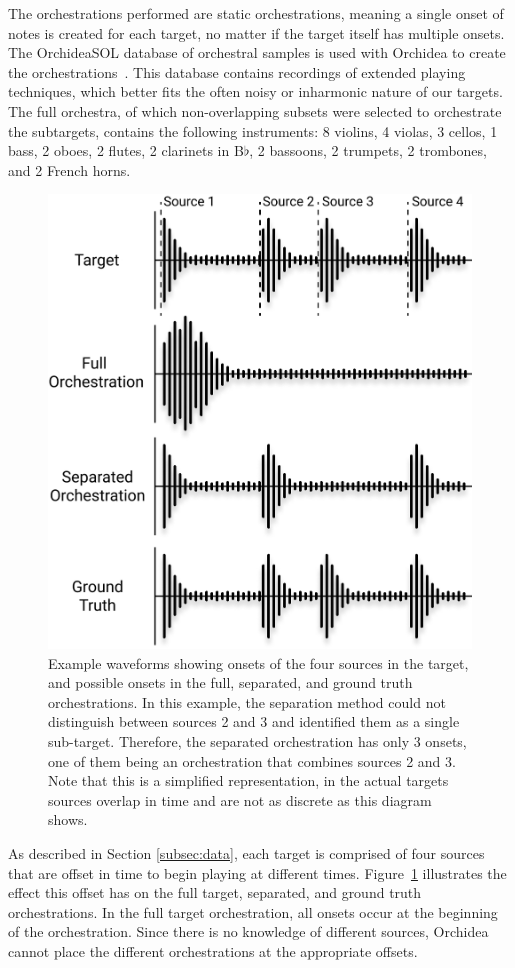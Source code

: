 \documentclass[letterpaper]{article}  %
\begin{document}
    The orchestrations performed are static orchestrations, meaning a single onset of notes is created for each target, no matter if the target itself has multiple onsets. The OrchideaSOL database of orchestral samples is used with Orchidea to create the orchestrations~\cite{Cella2020c}. This database contains recordings of extended playing techniques, which better fits the often noisy or inharmonic nature of our targets. The full orchestra, of which non-overlapping subsets were selected to orchestrate the subtargets, contains the following instruments: 8 violins, 4 violas, 3 cellos, 1 bass, 2 oboes, 2 flutes, 2 clarinets in B$\flat$, 2 bassoons, 2 trumpets, 2 trombones, and 2 French horns.

    \begin{figure}[t]
    \centering
      \includegraphics[width=0.7\columnwidth]{figures/orch.jpg}
      \caption{Example waveforms showing onsets of the four sources in the target, and possible onsets in the full, separated, and ground truth orchestrations. In this example, the separation method could not distinguish between sources 2 and 3 and identified them as a single sub-target. Therefore, the separated orchestration has only 3 onsets, one of them being an orchestration that combines sources 2 and 3. Note that this is a simplified representation, in the actual targets sources overlap in time and are not as discrete as this diagram shows.}\label{fig:orchestrations}
    \end{figure}

    As described in Section \ref{subsec:data}, each target is comprised of four sources that are offset in time to begin playing at different times. Figure~\ref{fig:orchestrations} illustrates the effect this offset has on the full target, separated, and ground truth orchestrations. In the full target orchestration, all onsets occur at the beginning of the orchestration. Since there is no knowledge of different sources, Orchidea cannot place the different orchestrations at the appropriate offsets.
\end{document}
